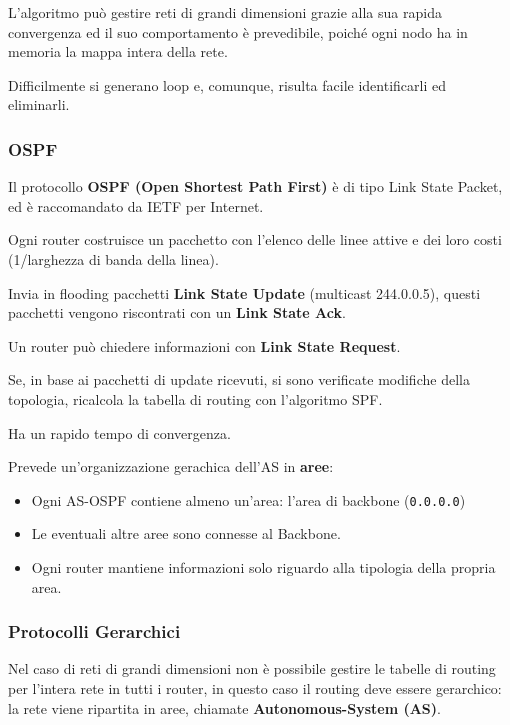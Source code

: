             L'algoritmo può gestire reti di grandi dimensioni grazie alla sua rapida convergenza ed il suo comportamento è prevedibile, poiché ogni nodo ha in memoria la mappa intera della rete.

            Difficilmente si generano loop e, comunque, risulta facile identificarli ed eliminarli.

        \subsubsection{OSPF}
            Il protocollo \textbf{OSPF (Open Shortest Path First)} è di tipo Link State Packet, ed è raccomandato da IETF per Internet.

            Ogni router costruisce un pacchetto con l'elenco delle linee attive e dei loro costi (1/larghezza di banda della linea).

            Invia in flooding pacchetti \textbf{Link State Update} (multicast 244.0.0.5), questi pacchetti vengono riscontrati con un \textbf{Link State Ack}.

            Un router può chiedere informazioni con \textbf{Link State Request}.

            Se, in base ai pacchetti di update ricevuti, si sono verificate modifiche della topologia, ricalcola la tabella di routing con l'algoritmo SPF.

            Ha un rapido tempo di convergenza.

            Prevede un'organizzazione gerachica dell'AS in \textbf{aree}:
            \begin{itemize}
                \item Ogni AS-OSPF contiene almeno un'area: l’area di backbone (\verb:0.0.0.0:)
                \item Le eventuali altre aree sono connesse al Backbone.
                \item Ogni router mantiene informazioni solo riguardo alla tipologia della propria area.
            \end{itemize}
        
        \subsubsection{Protocolli Gerarchici}
            Nel caso di reti di grandi dimensioni non è possibile gestire le tabelle di routing per l'intera rete in tutti i router, in questo caso il routing deve essere gerarchico: la rete viene ripartita in aree, chiamate \textbf{Autonomous-System (AS)}.

